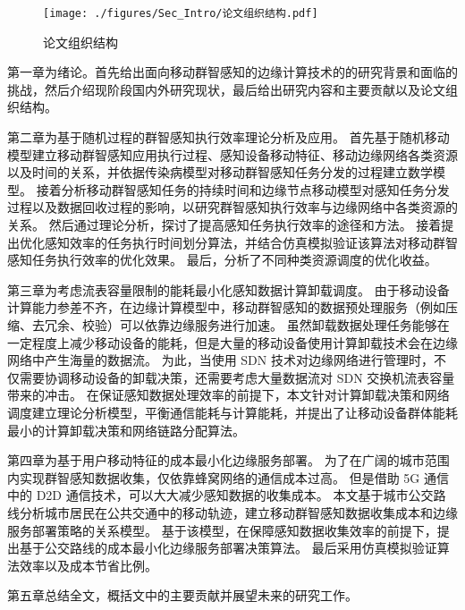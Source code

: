 \begin{figure}[!h]
\vspace{-0.8em}
\centering
  \texttt{[image: ./figures/Sec\_Intro/论文组织结构.pdf]}
  \caption{论文组织结构}
  \vspace{-1em}
  \label{Figure_Re_Instruction}
\end{figure}

第一章为绪论。首先给出面向移动群智感知的边缘计算技术的的研究背景和面临的挑战，然后介绍现阶段国内外研究现状，最后给出研究内容和主要贡献以及论文组织结构。

第二章为基于随机过程的群智感知执行效率理论分析及应用。
首先基于随机移动模型建立移动群智感知应用执行过程、感知设备移动特征、移动边缘网络各类资源以及时间的关系，并依据传染病模型对移动群智感知任务分发的过程建立数学模型。
接着分析移动群智感知任务的持续时间和边缘节点移动模型对感知任务分发过程以及数据回收过程的影响，以研究群智感知执行效率与边缘网络中各类资源的关系。
然后通过理论分析，探讨了提高感知任务执行效率的途径和方法。
接着提出优化感知效率的任务执行时间划分算法，并结合仿真模拟验证该算法对移动群智感知任务执行效率的优化效果。
最后，分析了不同种类资源调度的优化收益。

第三章为考虑流表容量限制的能耗最小化感知数据计算卸载调度。
由于移动设备计算能力参差不齐，在边缘计算模型中，移动群智感知的数据预处理服务（例如压缩、去冗余、校验）可以依靠边缘服务进行加速。
虽然卸载数据处理任务能够在一定程度上减少移动设备的能耗，但是大量的移动设备使用计算卸载技术会在边缘网络中产生海量的数据流。
为此，当使用 SDN 技术对边缘网络进行管理时，不仅需要协调移动设备的卸载决策，还需要考虑大量数据流对 SDN 交换机流表容量带来的冲击。
在保证感知数据处理效率的前提下，本文针对计算卸载决策和网络调度建立理论分析模型，平衡通信能耗与计算能耗，并提出了让移动设备群体能耗最小的计算卸载决策和网络链路分配算法。

第四章为基于用户移动特征的成本最小化边缘服务部署。
为了在广阔的城市范围内实现群智感知数据收集，仅依靠蜂窝网络的通信成本过高。
但是借助 5G 通信中的 D2D 通信技术，可以大大减少感知数据的收集成本。
本文基于城市公交路线分析城市居民在公共交通中的移动轨迹，建立移动群智感知数据收集成本和边缘服务部署策略的关系模型。
基于该模型，在保障感知数据收集效率的前提下，提出基于公交路线的成本最小化边缘服务部署决策算法。
最后采用仿真模拟验证算法效率以及成本节省比例。

第五章总结全文，概括文中的主要贡献并展望未来的研究工作。
